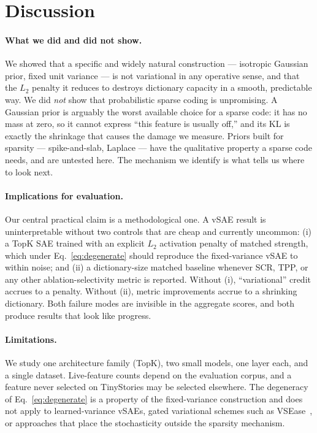 \documentclass{article}
\begin{document}
\section{Discussion}

\paragraph{What we did and did not show.} We showed that a specific and widely
natural construction --- isotropic Gaussian prior, fixed unit variance --- is not
variational in any operative sense, and that the $L_2$ penalty it reduces to
destroys dictionary capacity in a smooth, predictable way. We did \emph{not} show
that probabilistic sparse coding is unpromising. A Gaussian prior is arguably the
worst available choice for a sparse code: it has no mass at zero, so it cannot
express ``this feature is usually off,'' and its KL is exactly the shrinkage that
causes the damage we measure. Priors built for sparsity --- spike-and-slab,
Laplace --- have the qualitative property a sparse code needs, and are untested
here. The mechanism we identify is what tells us where to look next.

\paragraph{Implications for evaluation.} Our central practical claim is a
methodological one. A vSAE result is uninterpretable without two controls that are
cheap and currently uncommon: (i) a TopK SAE trained with an explicit $L_2$
activation penalty of matched strength, which under Eq.~\ref{eq:degenerate} should
reproduce the fixed-variance vSAE to within noise; and (ii) a dictionary-size
matched baseline whenever SCR, TPP, or any other ablation-selectivity metric is
reported. Without (i), ``variational'' credit accrues to a penalty. Without (ii),
metric improvements accrue to a shrinking dictionary. Both failure modes are
invisible in the aggregate scores, and both produce results that look like
progress.

\paragraph{Limitations.} We study one architecture family (TopK), two small models,
one layer each, and a single dataset. Live-feature counts depend on the evaluation
corpus, and a feature never selected on TinyStories may be selected elsewhere. The
degeneracy of Eq.~\ref{eq:degenerate} is a property of the fixed-variance
construction and does not apply to learned-variance vSAEs, gated variational
schemes such as VSEase~\citep{lu2025sparseautoencodersagain}, or approaches that
place the stochasticity outside the sparsity mechanism.



\end{document}
